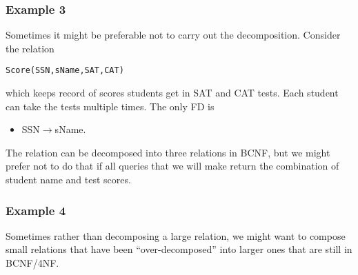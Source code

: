 \subsubsection{Example 3}
Sometimes it might be preferable not to carry out the decomposition. Consider the relation
\begin{lstlisting}
Score(SSN,sName,SAT,CAT)
\end{lstlisting}
which keeps record of scores students get in SAT and CAT tests. Each student can take the tests multiple times. The only FD is 
\begin{itemize}
\item SSN$\rightarrow$sName.
\end{itemize}
The relation can be decomposed into three relations in BCNF, but we might prefer not to do that if all queries that we will make return the combination of student name and test scores. 
\subsubsection{Example 4}
Sometimes rather than decomposing a large relation, we might want to compose small relations that have been ``over-decomposed'' into larger ones that are still in BCNF/4NF.
\ifx\PREAMBLE\undefined

\fi